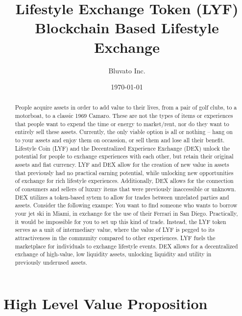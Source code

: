 \documentclass[11pt]{article}
\begin{document}
\title{%
Lifestyle Exchange Token (LYF) \\[1mm] 
\large Blockchain Based Lifestyle Exchange}
\author{Bluvato Inc.}
\date{\today}
\maketitle


\begin{abstract}
People acquire assets in order to add value to their lives, from a pair of golf clubs, to a motorboat, to a classic 1969 Camaro. These are not the types of items or experiences that people want to expend the time or energy to market/rent, nor do they want to entirely sell these assets. Currently, the only viable option is all or nothing -- hang on to your assets and enjoy them on occassion, or sell them and lose all their benefit. Lifestyle Coin (LYF) and the Decentralized Experience Exchange (DEX) unlock the potential for people to exchange experiences with each other, but retain their original assets and fiat currency. LYF and DEX allow for the creation of new value in assets that previously had no practical earning potential, while unlocking new opportunities of exchange for rich lifestyle experiences. Additionally, DEX allows for the connection of consumers and sellers of luxury items that were previously inaccessible or unknown. DEX utilizes a token-based sytem to allow for trades between unrelated parties and assets. Consider the following exampe: You want to find someone who wants to borrow your jet ski in Miami, in exchange for the use of their Ferrari in San Diego. Practically, it would be impossible for you to set up this kind of trade. Instead, the LYF token serves as a unit of intermediary value, where the value of LYF is pegged to its attractiveness in the community compared to other experiences. LYF fuels the marketplace for individuals to exchange lifestyle events. DEX allows for a decentralized exchange of high-value, low liquidity assets, unlocking liquidity and utility in previously underused assets.

\end{abstract}
\pagebreak

\tableofcontents
\pagebreak

\section{High Level Value Proposition}
\label{sec-2}
\end{document}
